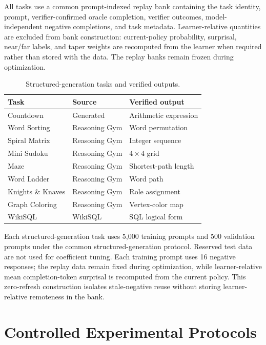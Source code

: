 \documentclass{article}
\theoremstyle{plain}
\theoremstyle{definition}
\theoremstyle{remark}
\begin{document}
All tasks use a common prompt-indexed replay bank containing the task
identity, prompt, verifier-confirmed oracle completion, verifier outcomes,
model-independent negative completions, and task metadata.
Learner-relative quantities are excluded from bank construction:
current-policy probability, surprisal, near/far labels, and taper weights
are recomputed from the learner when required rather than stored with the
data. The replay banks remain frozen during optimization.

\begin{table}[t]
\centering
\caption{Structured-generation tasks and verified outputs.}
\label{tab:structured_generation_tasks}
\small
\setlength{\tabcolsep}{3.2pt}
\begin{tabular*}{\columnwidth}{@{\extracolsep{\fill}}lll}
\toprule
Task & Source & Verified output \\
\midrule
Countdown & Generated & Arithmetic expression \\
Word Sorting & Reasoning Gym & Word permutation \\
Spiral Matrix & Reasoning Gym & Integer sequence \\
Mini Sudoku & Reasoning Gym & \(4\times4\) grid \\
Maze & Reasoning Gym & Shortest-path length \\
Word Ladder & Reasoning Gym & Word path \\
Knights \& Knaves & Reasoning Gym & Role assignment \\
Graph Coloring & Reasoning Gym & Vertex-color map \\
WikiSQL & WikiSQL & SQL logical form \\
\bottomrule
\end{tabular*}
\end{table}

Each structured-generation task uses 5,000 training prompts and
500 validation prompts under the common structured-generation protocol.
Reserved test data are not used for coefficient tuning. Each training prompt
uses 16 negative responses; the replay data remain fixed during optimization,
while learner-relative mean completion-token surprisal is recomputed from the
current policy. This zero-refresh construction isolates stale-negative reuse
without storing learner-relative remoteness in the bank.

\section{Controlled Experimental Protocols}
\label{app:controlled_protocols}
\end{document}
